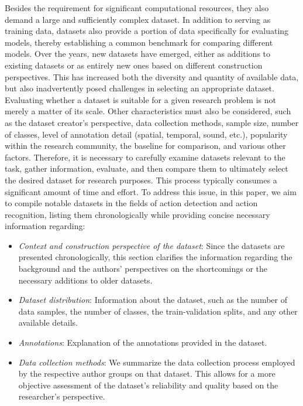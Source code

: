 \documentclass[10pt,onecolumn,letterpaper]{article}
\begin{document}
Besides the requirement for significant computational resources, they also
demand a large and sufficiently complex dataset. In addition to serving as
training data, datasets also provide a portion of data specifically for
evaluating models, thereby establishing a common benchmark for comparing
different models. Over the years, new datasets have emerged, either as additions
to existing datasets or as entirely new ones based on different construction
perspectives. This has increased both the diversity and quantity of available
data, but also inadvertently posed challenges in selecting an appropriate
dataset. Evaluating whether a dataset is suitable for a given research problem
is not merely a matter of its scale. Other characteristics must also be
considered, such as the dataset creator's perspective, data collection methods,
sample size, number of classes, level of annotation detail (spatial, temporal,
sound, etc.), popularity within the research community, the baseline for
comparison, and various other factors. Therefore, it is necessary to carefully
examine datasets relevant to the task, gather information, evaluate, and then
compare them to ultimately select the desired dataset for research purposes.
This process typically consumes a significant amount of time and effort. To
address this issue, in this paper, we aim to compile notable datasets in the
fields of action detection and action recognition, listing them chronologically
while providing concise necessary information regarding:

\begin{itemize}
	\item \textit{Context and construction perspective of the dataset}: Since the
	datasets are presented chronologically, this section clarifies the information
	regarding the background and the authors' perspectives on the shortcomings or
	the necessary additions to older datasets.
	\item \textit{Dataset distribution}: Information about the dataset, such as the
	number of data samples, the number of classes, the train-validation splits, and
	any other available details.
	\item \textit{Annotations}: Explanation of the annotations provided in the
	dataset.
	\item \textit{Data collection methods}: We summarize the data collection
	process employed by the respective author groups on that dataset. This allows
	for a more objective assessment of the dataset's reliability and quality based
	on the researcher's perspective.
\end{itemize}
\end{document}
